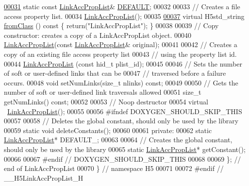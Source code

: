 \begin{DoxyCode}
\hyperlink{class_h5_1_1_link_acc_prop_list_abbf34b03d8f8c9cf225c704d59ebb7a8}{00031}         \textcolor{keyword}{static} \textcolor{keyword}{const} \hyperlink{class_h5_1_1_link_acc_prop_list}{LinkAccPropList}& \hyperlink{class_h5_1_1_link_acc_prop_list_abbf34b03d8f8c9cf225c704d59ebb7a8}{DEFAULT};
00032 
00033         \textcolor{comment}{// Creates a file access property list.}
00034         \hyperlink{class_h5_1_1_link_acc_prop_list}{LinkAccPropList}();
00035 
\hyperlink{class_h5_1_1_link_acc_prop_list_ae3031353168d39a801fb7ffd59bc9c7b}{00037}         \textcolor{keyword}{virtual} H5std\_string \hyperlink{class_h5_1_1_link_acc_prop_list_ae3031353168d39a801fb7ffd59bc9c7b}{fromClass} ()\textcolor{keyword}{ const }\{ \textcolor{keywordflow}{return}(\textcolor{stringliteral}{"LinkAccPropList"}); \}
00038 
00039         \textcolor{comment}{// Copy constructor: creates a copy of a LinkAccPropList object.}
00040         \hyperlink{class_h5_1_1_link_acc_prop_list}{LinkAccPropList}(\textcolor{keyword}{const} \hyperlink{class_h5_1_1_link_acc_prop_list}{LinkAccPropList}& original);
00041 
00042         \textcolor{comment}{// Creates a copy of an existing file access property list}
00043         \textcolor{comment}{// using the property list id.}
00044         \hyperlink{class_h5_1_1_link_acc_prop_list}{LinkAccPropList} (\textcolor{keyword}{const} hid\_t plist\_id);
00045 
00046         \textcolor{comment}{// Sets the number of soft or user-defined links that can be}
00047         \textcolor{comment}{// traversed before a failure occurs.}
00048         \textcolor{keywordtype}{void} setNumLinks(\textcolor{keywordtype}{size\_t} nlinks) \textcolor{keyword}{const};
00049 
00050         \textcolor{comment}{// Gets the number of soft or user-defined link traversals allowed}
00051         \textcolor{keywordtype}{size\_t} getNumLinks() \textcolor{keyword}{const};
00052 
00053         \textcolor{comment}{// Noop destructor}
00054         \textcolor{keyword}{virtual} ~\hyperlink{class_h5_1_1_link_acc_prop_list}{LinkAccPropList}();
00055 
00056 \textcolor{preprocessor}{#ifndef DOXYGEN\_SHOULD\_SKIP\_THIS}
00057 
00058         \textcolor{comment}{// Deletes the global constant, should only be used by the library}
00059         \textcolor{keyword}{static} \textcolor{keywordtype}{void} deleteConstants();
00060 
00061     \textcolor{keyword}{private}:
00062         \textcolor{keyword}{static} \hyperlink{class_h5_1_1_link_acc_prop_list}{LinkAccPropList}* DEFAULT\_;
00063 
00064         \textcolor{comment}{// Creates the global constant, should only be used by the library}
00065         \textcolor{keyword}{static} \hyperlink{class_h5_1_1_link_acc_prop_list}{LinkAccPropList}* getConstant();
00066 
00067 \textcolor{preprocessor}{#endif // DOXYGEN\_SHOULD\_SKIP\_THIS}
00068 
00069 \}; \textcolor{comment}{// end of LinkAccPropList}
00070 \} \textcolor{comment}{// namespace H5}
00071 
00072 \textcolor{preprocessor}{#endif // \_\_H5LinkAccPropList\_H}
\end{DoxyCode}
